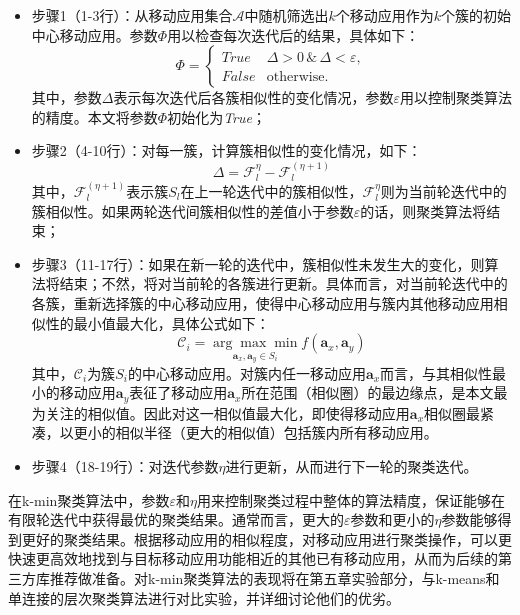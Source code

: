 \begin{itemize}
\item
步骤1（1-3行）：从移动应用集合$\mathcal{A}$中随机筛选出$k$个移动应用作为$k$个簇的初始中心移动应用。参数$\Phi$用以检查每次迭代后的结果，具体如下：
\begin{equation}
\Phi =
\left\{\begin{matrix}
True & \Delta > 0 \, \& \, \Delta < \varepsilon, \\
False & \mathrm{otherwise}.
\end{matrix}\right.
\end{equation}
其中，参数$\Delta$表示每次迭代后各簇相似性的变化情况，参数$\varepsilon$用以控制聚类算法的精度。本文将参数$\Phi$初始化为\textit{True}；

\item
步骤2（4-10行）：对每一簇，计算簇相似性的变化情况，如下：
\begin{equation}
\Delta = \mathcal{F}_l^{\eta} - \mathcal{F}_l^{(\eta+1)}
\end{equation}
其中，$\mathcal{F}_l^{(\eta+1)}$表示簇$S_l$在上一轮迭代中的簇相似性，$\mathcal{F}_l^{\eta}$则为当前轮迭代中的簇相似性。如果两轮迭代间簇相似性的差值小于参数$\varepsilon$的话，则聚类算法将结束；

\item
步骤3（11-17行）：如果在新一轮的迭代中，簇相似性未发生大的变化，则算法将结束；不然，将对当前轮的各簇进行更新。具体而言，对当前轮迭代中的各簇，重新选择簇的中心移动应用，使得中心移动应用与簇内其他移动应用相似性的最小值最大化，具体公式如下：
\begin{equation}
\mathcal{C}_i = \underset{\mathbf{a}_x, \mathbf{a}_y \in S_i}{\arg \max \min} f(\mathbf{a}_x, \mathbf{a}_y)
\end{equation}
其中，$\mathcal{C}_i$为簇$S_i$的中心移动应用。对簇内任一移动应用$\mathbf{a}_x$而言，与其相似性最小的移动应用$\mathbf{a}_y$表征了移动应用$\mathbf{a}_x$所在范围（相似圈）的最边缘点，是本文最为关注的相似值。因此对这一相似值最大化，即使得移动应用$\mathbf{a}_x$相似圈最紧凑，以更小的相似半径（更大的相似值）包括簇内所有移动应用。

\item
步骤4（18-19行）：对迭代参数$\eta$进行更新，从而进行下一轮的聚类迭代。
\end{itemize}

在k-min聚类算法中，参数$\varepsilon$和$\eta$用来控制聚类过程中整体的算法精度，保证能够在有限轮迭代中获得最优的聚类结果。通常而言，更大的$\varepsilon$参数和更小的$\eta$参数能够得到更好的聚类结果。根据移动应用的相似程度，对移动应用进行聚类操作，可以更快速更高效地找到与目标移动应用功能相近的其他已有移动应用，从而为后续的第三方库推荐做准备。对k-min聚类算法的表现将在第五章实验部分，与k-means和单连接的层次聚类算法进行对比实验，并详细讨论他们的优劣。




